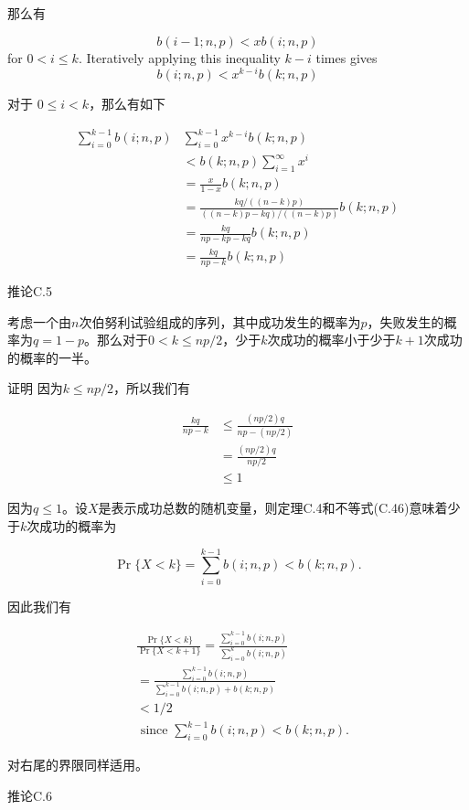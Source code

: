 \documentclass[lang=cn,newtx,10pt,scheme=chinese]{elegantbook}
\begin{document}
那么有

$$
b(i-1 ; n, p)<x b(i ; n, p)
$$
for $0<i \leq k$. Iteratively applying this inequality $k-i$ times gives
$$
b(i ; n, p)<x^{k-i} b(k ; n, p)
$$

对于 $0 \leq i<k$，那么有如下

$$
\begin{aligned}
\sum_{i=0}^{k-1} b(i ; n, p) & \sum_{i=0}^{k-1} x^{k-i} b(k ; n, p) \\
& <b(k ; n, p) \sum_{i=1}^{\infty} x^i \\
& =\frac{x}{1-x} b(k ; n, p) \\
& =\frac{k q /((n-k) p)}{((n-k) p-k q) /((n-k) p)} b(k ; n, p) \\
& =\frac{k q}{n p-k p-k q} b(k ; n, p) \\
& =\frac{k q}{n p-k} b(k ; n, p)
\end{aligned}
$$

推论C.5

考虑一个由$n$次伯努利试验组成的序列，其中成功发生的概率为$p$，失败发生的概率为$q=1-p$。那么对于$0<k \leq n p / 2$，少于$k$次成功的概率小于少于$k+1$次成功的概率的一半。

证明 因为$k \leq n p / 2$，所以我们有

$$
\begin{aligned}
\frac{k q}{n p-k} & \leq \frac{(n p / 2) q}{n p-(n p / 2)} \\
& =\frac{(n p / 2) q}{n p / 2} \\
& \leq 1
\end{aligned}
$$

因为$q \leq 1$。设$X$是表示成功总数的随机变量，则定理C.4和不等式(C.46)意味着少于$k$次成功的概率为

$$
\operatorname{Pr}\{X<k\}=\sum_{i=0}^{k-1} b(i ; n, p)<b(k ; n, p) .
$$

因此我们有

$$
\begin{aligned}
& \frac{\operatorname{Pr}\{X<k\}}{\operatorname{Pr}\{X<k+1\}}=\frac{\sum_{i=0}^{k-1} b(i ; n, p)}{\sum_{i=0}^k b(i ; n, p)} \\
&=\frac{\sum_{i=0}^{k-1} b(i ; n, p)}{\sum_{i=0}^{k-1} b(i ; n, p)+b(k ; n, p)} \\
&<1 / 2 \\
& \text { since } \sum_{i=0}^{k-1} b(i ; n, p)<b(k ; n, p) .
\end{aligned}
$$

对右尾的界限同样适用。

推论C.6
\end{document}
